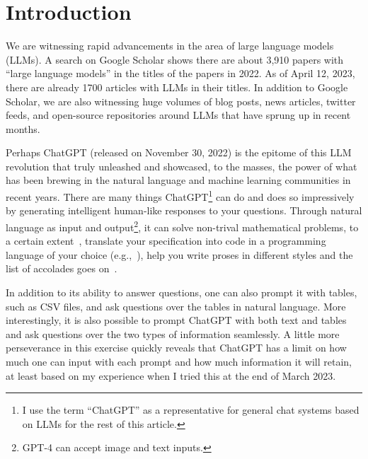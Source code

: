 \documentclass[11pt,dvipdfm]{article}
\begin{document}
\section{Introduction}
We are witnessing rapid advancements in the area of large language models (LLMs). A search on Google Scholar shows there are about 3,910 papers with ``large language models'' in the titles of the papers in 2022. As of April 12, 2023, there are already 1700 articles with LLMs in their titles. In addition to Google Scholar, we are also witnessing huge volumes of blog posts, news articles, twitter feeds, and open-source repositories around LLMs that have sprung up in recent months. 


Perhaps ChatGPT (released on November 30, 2022) is the epitome of this LLM revolution that truly unleashed and showcased, to the masses, the power of what has been brewing in the natural language and machine learning communities in recent years. There are many things ChatGPT\footnote{I use the term ``ChatGPT'' as a representative for general chat systems based on LLMs for the rest of this article.} can do and does so impressively by generating intelligent human-like responses to your questions. Through natural language as input and output\footnote{GPT-4 can accept image and text inputs.}, it can solve non-trival mathematical problems, to a certain extent~\cite{frieder2023mathematical,shakarian2023independent}, translate your specification into code in a programming language of your choice (e.g.,~\cite{kashefi2023chatgpt,shakarian2023independent}), help you write proses in different styles and the list of accolades goes on~\cite{nyt-chatgptuses}.  

In addition to its ability to answer questions, one can also prompt it with tables, such as CSV files, and ask questions over the tables in natural language. More interestingly, it is also possible to prompt ChatGPT with both text and tables and ask questions over the two types of information seamlessly. A little more perseverance in this exercise quickly reveals that ChatGPT has a limit on how much one can input with each prompt and how much information it will retain, at least based on my experience when I tried this at the end of March 2023.
\end{document}
